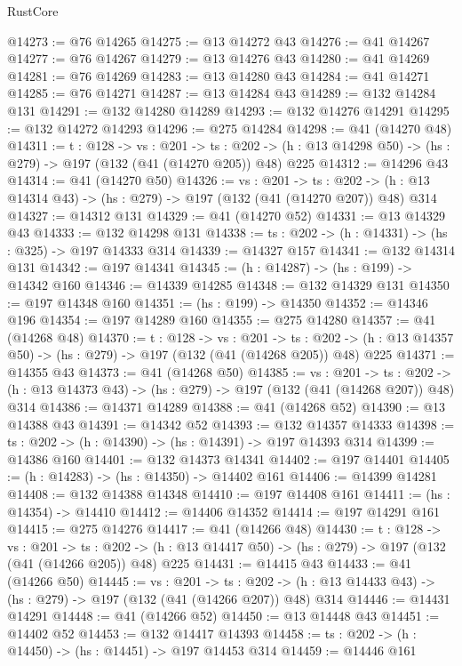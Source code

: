 \begin{lexlean}{RustCore}
\begin{coremodule}
@14273 := @76 @14265
@14275 := @13 @14272 @43
@14276 := @41 @14267
@14277 := @76 @14267
@14279 := @13 @14276 @43
@14280 := @41 @14269
@14281 := @76 @14269
@14283 := @13 @14280 @43
@14284 := @41 @14271
@14285 := @76 @14271
@14287 := @13 @14284 @43
@14289 := @132 @14284 @131
@14291 := @132 @14280 @14289
@14293 := @132 @14276 @14291
@14295 := @132 @14272 @14293
@14296 := @275 @14284
@14298 := @41 (@14270 @48)
@14311 := {t : @128} ->
  {vs : @201} ->
  {ts : @202} -> (h : @13 @14298 @50) -> (hs : @279) -> @197 (@132 (@41 (@14270 @205)) @48) @225
@14312 := @14296 @43
@14314 := @41 (@14270 @50)
@14326 := {vs : @201} ->
  {ts : @202} -> (h : @13 @14314 @43) -> (hs : @279) -> @197 (@132 (@41 (@14270 @207)) @48) @314
@14327 := @14312 @131
@14329 := @41 (@14270 @52)
@14331 := @13 @14329 @43
@14333 := @132 @14298 @131
@14338 := {ts : @202} -> (h : @14331) -> (hs : @325) -> @197 @14333 @314
@14339 := @14327 @157
@14341 := @132 @14314 @131
@14342 := @197 @14341
@14345 := (h : @14287) -> (hs : @199) -> @14342 @160
@14346 := @14339 @14285
@14348 := @132 @14329 @131
@14350 := @197 @14348 @160
@14351 := (hs : @199) -> @14350
@14352 := @14346 @196
@14354 := @197 @14289 @160
@14355 := @275 @14280
@14357 := @41 (@14268 @48)
@14370 := {t : @128} ->
  {vs : @201} ->
  {ts : @202} -> (h : @13 @14357 @50) -> (hs : @279) -> @197 (@132 (@41 (@14268 @205)) @48) @225
@14371 := @14355 @43
@14373 := @41 (@14268 @50)
@14385 := {vs : @201} ->
  {ts : @202} -> (h : @13 @14373 @43) -> (hs : @279) -> @197 (@132 (@41 (@14268 @207)) @48) @314
@14386 := @14371 @14289
@14388 := @41 (@14268 @52)
@14390 := @13 @14388 @43
@14391 := @14342 @52
@14393 := @132 @14357 @14333
@14398 := {ts : @202} -> (h : @14390) -> (hs : @14391) -> @197 @14393 @314
@14399 := @14386 @160
@14401 := @132 @14373 @14341
@14402 := @197 @14401
@14405 := (h : @14283) -> (hs : @14350) -> @14402 @161
@14406 := @14399 @14281
@14408 := @132 @14388 @14348
@14410 := @197 @14408 @161
@14411 := (hs : @14354) -> @14410
@14412 := @14406 @14352
@14414 := @197 @14291 @161
@14415 := @275 @14276
@14417 := @41 (@14266 @48)
@14430 := {t : @128} ->
  {vs : @201} ->
  {ts : @202} -> (h : @13 @14417 @50) -> (hs : @279) -> @197 (@132 (@41 (@14266 @205)) @48) @225
@14431 := @14415 @43
@14433 := @41 (@14266 @50)
@14445 := {vs : @201} ->
  {ts : @202} -> (h : @13 @14433 @43) -> (hs : @279) -> @197 (@132 (@41 (@14266 @207)) @48) @314
@14446 := @14431 @14291
@14448 := @41 (@14266 @52)
@14450 := @13 @14448 @43
@14451 := @14402 @52
@14453 := @132 @14417 @14393
@14458 := {ts : @202} -> (h : @14450) -> (hs : @14451) -> @197 @14453 @314
@14459 := @14446 @161

\end{coremodule}
\end{lexlean}
